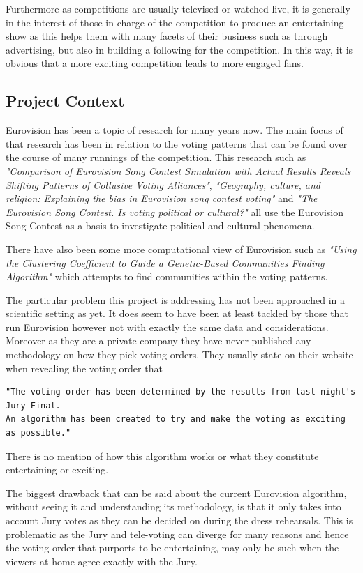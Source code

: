 \documentclass[12pt]{report}
\begin{document}
Furthermore as competitions are usually televised or watched live, it is generally in the interest of those in charge of the competition to produce an entertaining show as this helps them with many facets of their business such as through advertising, but also in building a following for the competition. In this way, it is obvious that a more exciting competition leads to more engaged fans.

\subsection{Project Context}\label{Project Context}
Eurovision has been a topic of research for many years now. The main focus of that research has been in relation to the voting patterns that can be found over the course of many runnings of the competition. This research such as \textit{"Comparison of Eurovision Song Contest Simulation with Actual Results Reveals Shifting Patterns of Collusive Voting Alliances"}\cite{gatherer2006}, \textit{"Geography, culture, and religion: Explaining the bias in Eurovision song contest voting"}\cite{so66198} and \textit{"The Eurovision Song Contest. Is voting political or cultural?"} \cite{Ginsburgh200841} all use the Eurovision Song Contest as a basis to investigate political and cultural phenomena.

There have also been some more computational view of Eurovision such as \textit{"Using the Clustering Coefficient to Guide a Genetic-Based Communities Finding Algorithm"}\cite{Bello2011} which attempts to find communities within the voting patterns.

The particular problem this project is addressing has not been approached in a scientific setting as yet. It does seem to have been at least tackled by those that run Eurovision however not with exactly the same data and considerations. Moreover as they are a private company they have never published any methodology on how they pick voting orders. They usually state on their website when revealing the voting order that 
\begin{verbatim}"The voting order has been determined by the results from last night's Jury Final.
An algorithm has been created to try and make the voting as exciting as possible."
\end{verbatim}\cite{votingOrderQuote}
There is no mention of how this algorithm works or what they constitute entertaining or exciting.

The biggest drawback that can be said about the current Eurovision algorithm, without seeing it and understanding its methodology, is that it only takes into account Jury votes as they can be decided on during the dress rehearsals. This is problematic as the Jury and tele-voting can diverge for many reasons and hence the voting order that purports to be entertaining, may only be such when the viewers at home agree exactly with the Jury.
\end{document}
